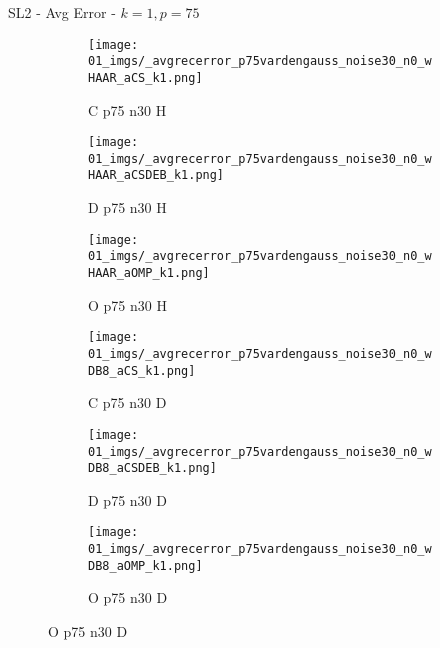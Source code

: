 \begin{frame}{SL2 - Avg Error - $k=1,p=75$}{}
\begin{figure}
\vspace{5pt}

\begin{subfigure}{0.13\textwidth}
\texttt{[image: 01\_imgs/\_avgrecerror\_p75vardengauss\_noise30\_n0\_wHAAR\_aCS\_k1.png]}
\caption*{\tiny C p75 n30 H}
\end{subfigure}
\begin{subfigure}{0.13\textwidth}
\texttt{[image: 01\_imgs/\_avgrecerror\_p75vardengauss\_noise30\_n0\_wHAAR\_aCSDEB\_k1.png]}
\caption*{\tiny D p75 n30 H}
\end{subfigure}
\begin{subfigure}{0.13\textwidth}
\texttt{[image: 01\_imgs/\_avgrecerror\_p75vardengauss\_noise30\_n0\_wHAAR\_aOMP\_k1.png]}
\caption*{\tiny O p75 n30 H}
\end{subfigure}
\begin{subfigure}{0.13\textwidth}
\texttt{[image: 01\_imgs/\_avgrecerror\_p75vardengauss\_noise30\_n0\_wDB8\_aCS\_k1.png]}
\caption*{\tiny C p75 n30 D}
\end{subfigure}
\begin{subfigure}{0.13\textwidth}
\texttt{[image: 01\_imgs/\_avgrecerror\_p75vardengauss\_noise30\_n0\_wDB8\_aCSDEB\_k1.png]}
\caption*{\tiny D p75 n30 D}
\end{subfigure}
\begin{subfigure}{0.13\textwidth}
\texttt{[image: 01\_imgs/\_avgrecerror\_p75vardengauss\_noise30\_n0\_wDB8\_aOMP\_k1.png]}
\caption*{\tiny O p75 n30 D}
\end{subfigure}
\end{figure}
\end{frame}



